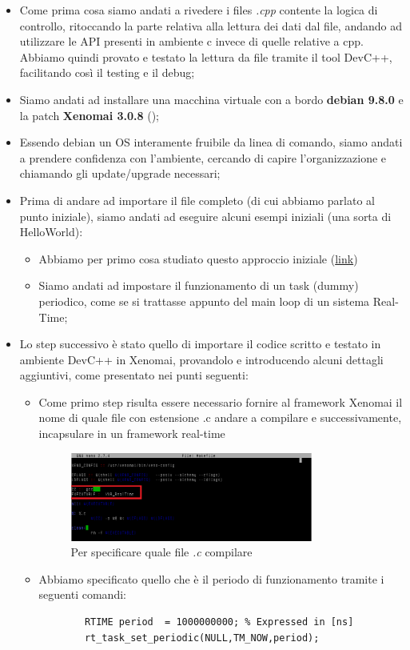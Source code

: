 \begin{itemize}
	\item Come prima cosa siamo andati a rivedere i files \textit{.cpp} contente la logica di controllo, ritoccando la parte relativa alla lettura dei dati dal file, andando ad utilizzare le API presenti in ambiente c invece di quelle relative a cpp.
	Abbiamo quindi provato e testato la lettura da file tramite il tool DevC++, facilitando così il testing e il debug;
	\item Siamo andati ad installare una macchina virtuale con a bordo \textbf{debian 9.8.0} e la patch \textbf{Xenomai 3.0.8} (\cite{xenomai});
	\item Essendo debian un OS interamente fruibile da linea di comando, siamo andati a prendere confidenza con l'ambiente, cercando di capire l'organizzazione e chiamando gli update/upgrade necessari;
	\item Prima di andare ad importare il file completo (di cui abbiamo parlato al punto iniziale), siamo andati ad eseguire alcuni esempi iniziali (una sorta di HelloWorld):
	\begin{itemize}
		\item Abbiamo per primo cosa studiato questo approccio iniziale (\href{http://www.cs.ru.nl/J.Hooman/DES/XenomaiExercises/Exercise-1.html}{link})
		\item Siamo andati ad impostare il funzionamento di un task (dummy) periodico, come se si trattasse appunto del main loop di un sistema Real-Time;
	\end{itemize}
	
	\item Lo step successivo è stato quello di importare il codice scritto e testato in ambiente DevC++ in Xenomai, provandolo e introducendo alcuni dettagli aggiuntivi, come presentato nei punti seguenti:
	\begin{itemize}
		\item Come primo step risulta essere necessario fornire al framework Xenomai il nome di quale file con estensione .c andare a compilare e successivamente, incapsulare in un framework real-time
			\begin{figure}[H]
				\centering   	
				\includegraphics[width=0.8\textwidth]{Immagini/xenomai_nano_make.png}
				\caption{Per specificare quale file \textit{.c} compilare}
				\label{fig:xenomai_nano_make}
			\end{figure}
		\item Abbiamo specificato quello che è il periodo di funzionamento  tramite i seguenti comandi:
		\begin{lstlisting}
		RTIME period  = 1000000000; % Expressed in [ns]
		rt_task_set_periodic(NULL,TM_NOW,period);
		\end{lstlisting}
		

\end{itemize}
\end{itemize}
